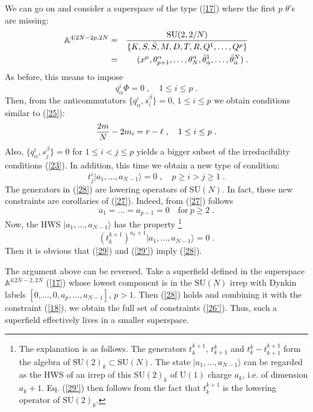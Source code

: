 \documentclass[a4paper,12pt]{article}
\begin{document}
We can go on and consider a superspace of the type (\ref{17}) 
where the first $p$ $\theta$'s are missing: 
\begin{eqnarray}
{\mathbb A}^{4\vert 2N-2p,2N}  &=& {\mbox{SU}(2,2/N)\over 
\{K,S,\bar S,M,D,T,R,Q^1,\ldots, Q^p\}} \nonumber\\ 
  &=& (x^\mu,\theta^{\alpha}_{p+1},\ldots,\theta^{\alpha}_N,
\bar\theta^1_{\dot\alpha}, 
\ldots, \bar\theta^N_{\dot\alpha}) \;. \label{26} 
\end{eqnarray}
As before, this means to impose
\begin{equation}\label{26'}
  q^i_\alpha\Phi=0\;, \quad 1\leq i \leq p \;. 
\end{equation}
Then, from the anticommutators $\{q^i_\alpha, s^\beta_i\}=0$, 
$1\leq i \leq p$ we obtain conditions similar to (\ref{25}): 
\begin{equation}\label{27}
{2m\over N} - 2m_i =r-\ell\;, \quad 1\leq i \leq p \;. 
\end{equation}
Also, $\{q^i_\alpha, s^\beta_j\}=0$ for $1\leq i < j \leq p$ 
yields a bigger subset of the irreducibility conditions 
(\ref{23}). In addition, this time we obtain a new type of 
condition: 
\begin{equation}\label{28}
  t^i_j|a_1,\ldots,a_{N-1}\rangle =0\;, \quad p\geq i 
> j\geq 1\;.
\end{equation}
The generators in (\ref{28}) are lowering operators of 
$\mbox{SU}(N)$. In fact, these new constraints are corollaries of 
(\ref{27}). Indeed, from (\ref{27}) follows 
\begin{equation}\label{29}
 a_1=\ldots=a_{p-1}=0 \quad \mbox{for}\ p\geq2\;.
\end{equation}
Now, the HWS $|a_1,\ldots,a_{N-1}\rangle$ has the property 
\footnote{The explanation is as follows. The generators 
$t^{k+1}_k$, $t_{k+1}^k$ and $t^k_k-t^{k+1}_{k+1}$ form the 
algebra of $\mbox{SU}(2)_k\subset \mbox{SU}(N)$. The state 
$|a_1,\ldots,a_{N-1}\rangle $ can be regarded as the HWS of an 
irrep of this $\mbox{SU}(2)_k$ of $\mbox{U}(1)$ charge $a_k$, i.e. 
of dimension $a_k+1$. Eq.  (\ref{29'}) then follows from the fact 
that $t^{k+1}_k$ is the lowering operator of $\mbox{SU}(2)_k$.} 
\begin{equation}\label{29'}
  (t^{k+1}_k)^{a_k+1}|a_1,\ldots,a_{N-1}\rangle =0\;.
\end{equation}
Then it is obvious that (\ref{29}) and (\ref{29'}) imply 
(\ref{28}). 

The argument above can be reversed. Take a superfield defined in 
the superspace ${\mathbb A}^{4\vert 2N-2,2N}$ (\ref{17}) whose 
lowest component is in the $\mbox{SU}(N)$ irrep with Dynkin labels 
$[0,\ldots,0,a_p,\ldots,a_{N-1}]$, $p>1$. Then (\ref{28}) holds 
and combining it with the constraint (\ref{18}), we obtain the 
full set of constraints (\ref{26'}). Thus, such a superfield 
effectively lives in a smaller superspace. 
\end{document}
